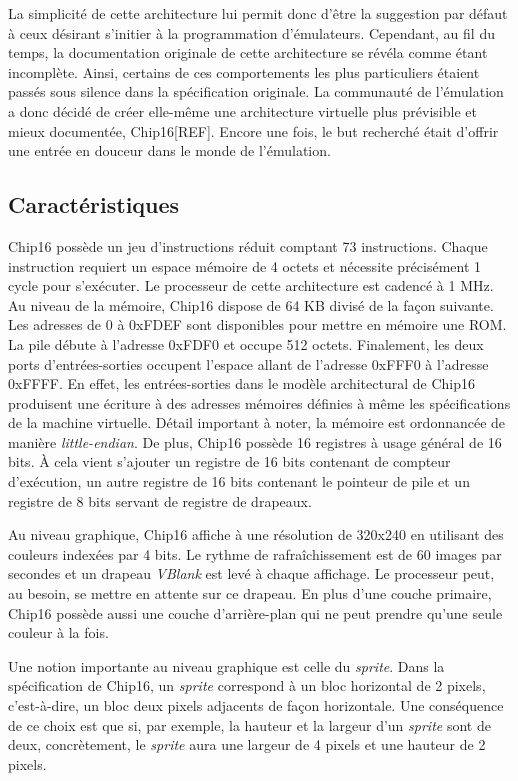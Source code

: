 \documentclass{article} %
\begin{document}
La simplicité de cette architecture lui permit donc d'être la suggestion par défaut à ceux désirant s'initier à la programmation d'émulateurs. Cependant, au fil du temps, la documentation originale de cette architecture se révéla comme étant incomplète. Ainsi, certains de ces comportements les plus particuliers étaient passés sous silence dans la spécification originale. La communauté de l'émulation a donc décidé de créer elle-même une architecture virtuelle plus prévisible et mieux documentée, Chip16[REF]. Encore une fois, le but recherché était d'offrir une entrée en douceur dans le monde de l'émulation.

\subsection{Caractéristiques}
Chip16 possède un jeu d'instructions réduit comptant 73 instructions. Chaque instruction requiert un espace mémoire de 4 octets et nécessite précisément 1 cycle pour s'exécuter. Le processeur de cette architecture est cadencé à 1 MHz. Au niveau de la mémoire, Chip16 dispose de 64 KB divisé de la façon suivante. Les adresses de 0 à 0xFDEF sont disponibles pour mettre en mémoire une ROM. La pile débute à l'adresse 0xFDF0 et occupe 512 octets. Finalement, les deux ports d'entrées-sorties occupent l'espace allant de l'adresse 0xFFF0 à l'adresse 0xFFFF. En effet, les entrées-sorties dans le modèle architectural de Chip16 produisent une écriture à des adresses mémoires définies à même les spécifications de la machine virtuelle. Détail important à noter, la mémoire est ordonnancée de manière \textit{little-endian}. De plus, Chip16 possède 16 registres à usage général de 16 bits. À cela vient s'ajouter un registre de 16 bits contenant de compteur d'exécution, un autre registre de 16 bits contenant le  pointeur de pile et un registre de 8 bits servant de registre de drapeaux. 

Au niveau graphique, Chip16 affiche à une résolution de 320x240 en utilisant des couleurs indexées par 4 bits. Le rythme de rafraîchissement est de 60 images par secondes et un drapeau \textit{VBlank} est levé à chaque affichage. Le processeur peut, au besoin, se mettre en attente sur ce drapeau. En plus d'une couche primaire, Chip16 possède aussi une couche d'arrière-plan qui ne peut prendre qu'une seule couleur à la fois. 

Une notion importante au niveau graphique est celle du \textit{sprite}. Dans la spécification de Chip16, un \textit{sprite} correspond à un bloc horizontal de 2 pixels, c'est-à-dire, un bloc deux pixels adjacents de façon horizontale. Une conséquence de ce choix est que si, par exemple, la hauteur et la largeur d'un \textit{sprite} sont de deux, concrètement, le \textit{sprite} aura une largeur de 4 pixels et une hauteur de 2 pixels.
\end{document}
